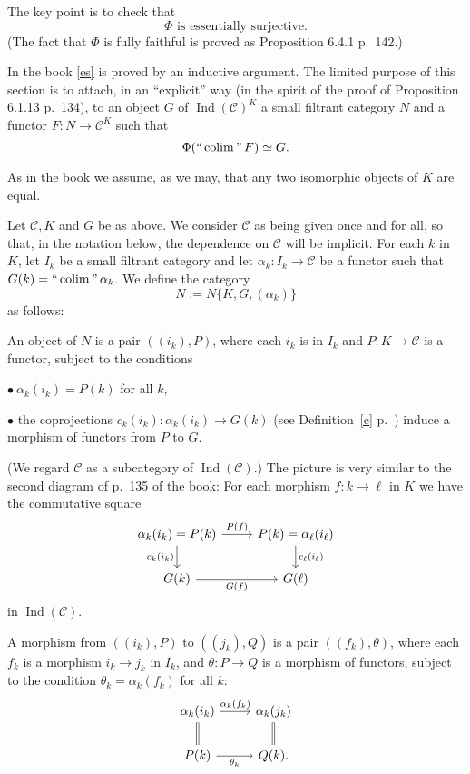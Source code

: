\documentclass[12pt]{article}
\theoremstyle{remark}
\theoremstyle{definition}
\newcommand{\bu}{\bullet}
\newcommand{\C}{\mathcal C}
\DeclareMathOperator*{\coli}{colim}
\DeclareMathOperator*{\ic}{``\coli"}
\DeclareMathOperator{\Ind}{Ind}
\begin{document}
The key point is to check that 
%
\begin{equation}\label{es} 
\Phi\text{ is essentially surjective.} 
\end{equation} 
%
(The fact that $\Phi$ is fully faithful is proved as Proposition 6.4.1 p.~142.) 

In the book \eqref{es} is proved by an inductive argument. The limited purpose of this section is to attach, in an ``explicit'' way (in the spirit of the proof of Proposition 6.1.13 p.~134), to an object $G$ of $\Ind(\C)^K$ a small filtrant category $N$ and a functor $F:N\to\C^K$ such that 
$$ 
\Phi(\ic F)\simeq G. 
$$ 

As in the book we assume, as we may, that any two isomorphic objects of $K$ are equal. 

Let $\C,K$ and $G$ be as above. We consider $\C$ as being given once and for all, so that, in the notation below, the dependence on $\C$ will be implicit. For each $k$ in $K$, let $I_k$ be a small filtrant category and let $\alpha_k:I_k\to\C$ be a functor such that $G(k)=\ic\alpha_k$. We define the category 
$$
N:=N\{K,G,(\alpha_k)\}
$$ 
as follows:

An object of $N$ is a pair $((i_k),P)$, where each $i_k$ is in $I_k$ and $P:K\to\C$ is a functor, subject to the conditions 

\noindent$\bu\ \alpha_k(i_k)=P(k)$ for all $k$, 

\noindent$\bu$ the coprojections $c_k(i_k):\alpha_k(i_k)\to G(k)$ (see Definition~\ref{c} p.~\pageref{c}) induce a morphism of functors from $P$ to $G$. 

\noindent(We regard $\C$ as a subcategory of $\Ind(\C)$.) The picture is very similar to the second diagram of p.~135 of the book: For each morphism $f:k\to\ell$ in $K$ we have the commutative square 
$$ 
\begin{tikzcd} 
\alpha_k(i_k)=P(k)\ar{r}{P(f)}\ar{d}[swap]{c_k(i_k)}&P(k)=\alpha_\ell(i_\ell)\ar{d}{c_\ell(i_\ell)}\\ 
G(k)\ar{r}[swap]{G(f)}&G(\ell) 
\end{tikzcd} 
$$ 
in $\Ind(\C)$. 

A morphism from $((i_k),P)$ to $((j_k),Q)$ is a pair $((f_k),\theta)$, where each $f_k$ is a morphism $i_k\to j_k$ in $I_k$, and $\theta:P\to Q$ is a morphism of functors, subject to the condition $\theta_k=\alpha_k(f_k)$ for all $k$: 
$$ 
\begin{tikzcd} 
\alpha_k(i_k)\ar{r}{\alpha_k(f_k)}\ar[equal]{d}&\alpha_k(j_k)\ar[equal]{d}\\ 
P(k)\ar{r}[swap]{\theta_k}&Q(k).
\end{tikzcd} 
$$ 
\end{document}
